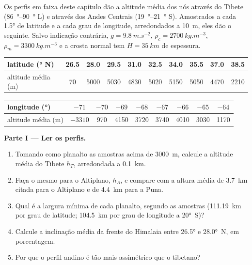 \begin{problem}\label{pb:b2:himalaya-andes:1}
Os perfis em faixa deste capítulo dão a altitude média dos nós através do Tibete
(\qtyrange{86}{90}{\degree} L) e através dos Andes Centrais (\qtyrange{19}{21}{\degree} S).
Amostrados a cada \ang{1.5} de latitude e a cada grau de longitude, arredondados a \qty{10}{m}, eles
dão o seguinte. Salvo indicação contrária, $g = \qty{9.8}{m.s^{-2}}$, $\rho_c = \qty{2700}{kg.m^{-3}}$,
$\rho_m = \qty{3300}{kg.m^{-3}}$ e a crosta normal tem $H = \qty{35}{km}$ de espessura.

\smallskip
\begin{center}\small
\begin{tabular}{l|ccccccccc}
latitude (\unit{\degree} N) & 26.5 & 28.0 & 29.5 & 31.0 & 32.5 & 34.0 & 35.5 & 37.0 & 38.5 \\ \hline
altitude média (\unit{m}) & 70 & 5000 & 5030 & 4830 & 5020 & 5150 & 5050 & 4470 & 2210
\end{tabular}

\smallskip
\begin{tabular}{l|cccccccc}
longitude (\unit{\degree}) & $-71$ & $-70$ & $-69$ & $-68$ & $-67$ & $-66$ & $-65$ & $-64$ \\ \hline
altitude média (\unit{m}) & $-3310$ & 970 & 4150 & 3720 & 3740 & 4010 & 3030 & 1170
\end{tabular}
\end{center}
\smallskip

\noindent\textbf{Parte I --- Ler os perfis.}
\begin{enumerate}
\item Tomando como planalto as amostras acima de \qty{3000}{m}, calcule a altitude média do Tibete
$h_T$, arredondada a \qty{0.1}{km}.
\item Faça o mesmo para o Altiplano, $h_A$, e compare com a altura média de
\qty{3.7}{km} citada para o Altiplano e de \qty{4.4}{km} para a Puna.
\item Qual é a largura mínima de cada planalto, segundo as amostras (\qty{111.19}{km} por
grau de latitude; \qty{104.5}{km} por grau de longitude a \ang{20}~S)?
\item Calcule a inclinação média da frente do Himalaia entre \ang{26.5} e \ang{28.0}~N, em
porcentagem.
\item Por que o perfil andino é tão mais assimétrico que o tibetano?
\end{enumerate}


\end{problem}
